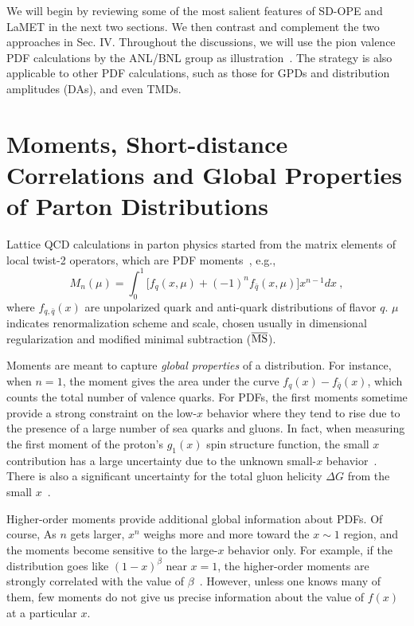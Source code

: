 \documentclass[prd,aps,twocolumn,preprintnumbers,showpacs,nofootinbib,superscriptaddress,notitlepage]{revtex4-2}
\begin{document}
We will begin by reviewing some of the most salient features of SD-OPE and LaMET in the next two sections. We then contrast and complement the two approaches in Sec. IV. Throughout the discussions, we will use the pion valence PDF calculations by the ANL/BNL group as illustration~\cite{Gao:2020ito,Gao:2021hxl,Gao:2021dbh}. The strategy is also applicable to other PDF calculations, such as those for GPDs and distribution amplitudes (DAs), and even TMDs. 

\section{Moments, Short-distance Correlations and 
Global Properties of Parton Distributions}

Lattice QCD calculations in parton physics started from the matrix elements of local twist-2 operators,
which are PDF moments~\cite{Martinelli:1987bh,Gockeler:1995wg}, e.g.,
\begin{equation}
    M_n(\mu) = \int^1_{0} \Big[f_q (x,\mu) +(-1)^n f_{\bar q}(x,\mu)\Big]x^{n-1} dx \ , 
\end{equation}
where $f_{q,\bar q}(x)$ are unpolarized quark and anti-quark distributions of flavor $q$. 
$\mu$ indicates renormalization scheme and scale, chosen usually in dimensional regularization and modified minimal subtraction ($\overline{\rm MS}$).

Moments are meant to capture {\it global properties} of a distribution. For instance, when $n=1$, the moment
gives the area under the curve $f_q(x)-f_{\bar q}(x)$, which counts the total number of
valence quarks. For PDFs, the first moments sometime provide a strong constraint on the low-$x$ behavior where they tend to rise due to the presence of a large number of sea quarks and gluons. In fact, when measuring the first moment of the proton's $g_1(x)$ spin structure function, the small $x$ contribution has a large uncertainty due to the unknown small-$x$ behavior~\cite{E143:1994vcg}. There is also a significant uncertainty for the total gluon helicity $\Delta G$
from the small $x$~\cite{deFlorian:2014yva}. 

Higher-order moments provide additional global information about PDFs. Of course, As $n$ gets larger, $x^n$ weighs more and more toward the $x\sim 1$ region, and the moments become sensitive to the large-$x$ behavior only. For example, if the distribution goes like $(1-x)^\beta$ near $x=1$, the higher-order moments are strongly correlated with the value of $\beta$~\cite{Gao:2020ito}. However, unless one knows many of them, few moments do not give us precise information about the value of $f(x)$ at a particular $x$. 
\end{document}
